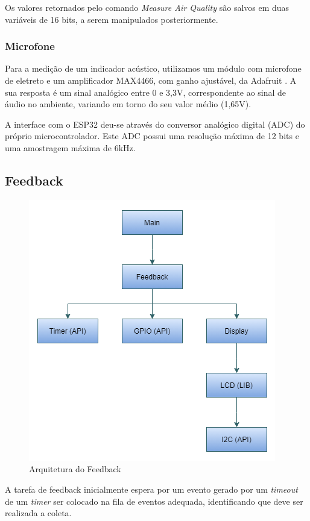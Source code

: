 \documentclass[../monografia.tex]{subfiles}
\begin{document}
Os valores retornados pelo comando \textit{Measure Air Quality} são salvos em duas variáveis de 16 bits, a serem manipulados posteriormente.

\subsubsection{Microfone}

Para a medição de um indicador acústico, utilizamos um módulo com microfone de eletreto e um amplificador MAX4466, com ganho ajustável, da Adafruit \cite{max4466}.
A sua resposta é um sinal analógico entre 0 e 3,3V, correspondente ao sinal de áudio no ambiente, variando em torno do seu valor médio (1,65V). 

A interface com o ESP32 deu-se através do conversor analógico digital (ADC) do próprio microcontrolador. Este ADC possui uma resolução máxima de 12 bits e uma amostragem máxima de 6kHz. 

\subsection{Feedback}

\begin{figure}[h]
	\centering
	\includegraphics[scale=0.8]{feedback-arch}
	\caption{Arquitetura do Feedback}
	\label{fig:feedback-arch}
\end{figure}

A tarefa de feedback inicialmente espera por um evento gerado por um \textit{timeout} de um \textit{timer} ser colocado na fila de eventos adequada, identificando que deve ser realizada a coleta.
\end{document}
